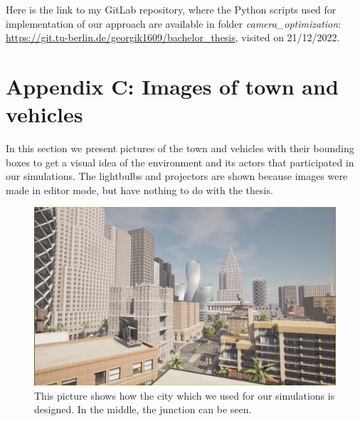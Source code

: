 Here is the link to my GitLab repository, where the Python scripts used for implementation of our approach are available in folder \textit{camera\_optimization}: \url{https://git.tu-berlin.de/georgik1609/bachelor_thesis}, visited on 21/12/2022.

\newpage
{}
\section*{Appendix C: Images of town and vehicles}
In this section we present pictures of the town and vehicles with their bounding boxes to get a visual idea of the environment and its actors that participated in our simulations. The lightbulbs and projectors are shown because images were made in editor mode, but have nothing to do with the thesis.



\begin{figure} [h!]
    \centering
    \includegraphics[width=\textwidth]{images/experiment_city.png}
    \caption[Environment for experiments]{This picture shows how the city which we used for our simulations is designed. In the middle, the junction can be seen.}
    \label{fig:city_experiments}
\end{figure}

